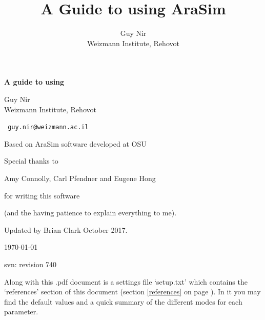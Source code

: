 \documentclass[a4paper,10pt]{article}
\newcommand{\room}{\vspace{0.3cm}}
\newcommand{\arasim}{AraSim\xspace}
\begin{document}
 



\begin{centering}

\title{A Guide to using AraSim}

\noindent\huge \textbf{A guide to using  }

\normalsize
\room

\author{Guy Nir \\ \small Weizmann Institute, Rehovot}

\Large Guy Nir \\ \small Weizmann Institute, Rehovot

\vspace{0.3cm}

\verb| guy.nir@weizmann.ac.il |

\vspace{1cm}

Based on \arasim software developed at OSU

Special thanks to 

Amy Connolly, Carl Pfendner and Eugene Hong 

for writing this software 

(and the having patience to explain everything to me). 

Updated by Brian Clark October 2017.

\room

\today

svn: revision 740

\end{centering}

\vspace{3cm}


Along with this .pdf document is a settings file `setup.txt' which contains the `references' section of this document (section \ref{references} on page \pageref{references}). In it you may find the default values and a quick summary of the different modes for each parameter. 
\end{document}
